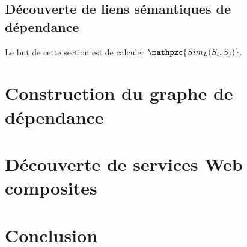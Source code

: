 \newpage
\subsection{Découverte de liens sémantiques de dépendance}
\label{sec:matching-siml}

Le but de cette section est de calculer {\large
  $\mathpzc{Sim_L(S_i, S_j)}$}.

\newpage
\section{Construction du graphe de dépendance}
\label{sec:ch3/graph}

\section{Découverte de services Web composites}
\label{sec:ch3/composition}

\section*{Conclusion}
\label{sec:ch3/conclusion}
 


